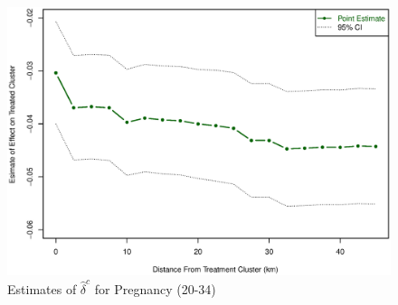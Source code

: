 \documentclass[10pt,letterpaper,subeqn]{beamer}
\begin{document}
\begin{frame}[label=dist2034]
\begin{figure}[htpb!]
\begin{center}
\caption{Estimates of $\hat\delta^c$ for Pregnancy (20-34)}
\label{TEENfig:Dist1519}
\vspace{-5mm}
\includegraphics[scale=0.44]{./../../Figures/Dist2034.eps} 
\end{center}
\end{figure}
\hyperlink{dist2034}{}
\end{frame}


\begin{frame}

\end{frame}
\end{document}

